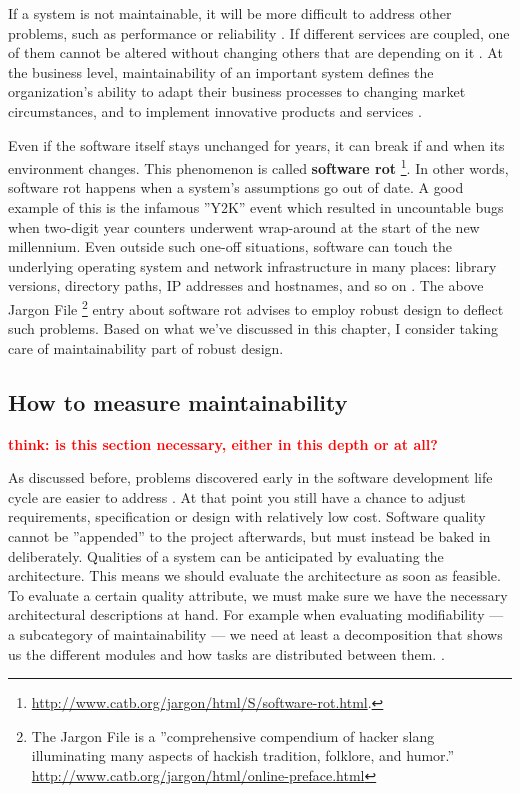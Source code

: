 \documentclass[utf8,english]{gradu3}
\newcommand{\todo}[1]{\textbf{\textcolor{red}{#1}}}
\begin{document}
If a system is not maintainable, it will be more difficult to address other
problems, such as performance or reliability \parencite[46]{Bouwers2010}. If
different services are coupled, one of them cannot be altered without changing
others that are depending on it \parencite[2]{Vale2022}. At the business level,
maintainability of an important system defines the organization's ability to
adapt their business processes to changing market circumstances, and to
implement innovative products and services \parencite[21]{Broy2006}.

Even if the software itself stays unchanged for years, it can break if and when
its environment changes. This phenomenon is called \textbf{software rot}
\footnote{\url{http://www.catb.org/jargon/html/S/software-rot.html}.}. In other
words, software rot happens when a system's assumptions go out of date. A good
example of this is the infamous ''Y2K'' event which resulted in uncountable bugs
when two-digit year counters underwent wrap-around at the start of the new
millennium. Even outside such one-off situations, software can touch the
underlying operating system and network infrastructure in many places: library
versions, directory paths, IP addresses and hostnames, and so on
\parencite{Heroku2011}. The above Jargon File \footnote{The Jargon File is a
  ''comprehensive compendium of hacker slang illuminating many aspects of hackish
  tradition, folklore, and humor.''
  \url{http://www.catb.org/jargon/html/online-preface.html}} entry about software
rot advises to employ robust design to deflect such problems. Based on what
we've discussed in this chapter, I consider taking care of maintainability part
of robust design.


\subsection{How to measure maintainability}

\todo{think: is this section necessary, either in this depth or at all?}

As discussed before, problems discovered early in the software development life
cycle are easier to address \parencite{Bass1998}. At that point you still have a
chance to adjust requirements, specification or design with relatively low cost.
Software quality cannot be ''appended'' to the project afterwards, but must
instead be baked in deliberately. Qualities of a system can be anticipated by
evaluating the architecture. This means we should evaluate the architecture as
soon as feasible. To evaluate a certain quality attribute, we must make sure we
have the necessary architectural descriptions at hand. For example when
evaluating modifiability --- a subcategory of maintainability --- we need at
least a decomposition that shows us the different modules and how tasks are
distributed between them. \parencite[32, 190-191]{Bass1998}.
\end{document}
